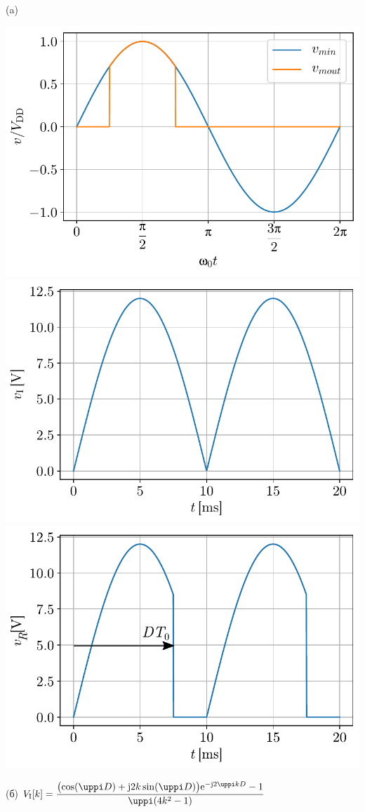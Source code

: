 \textsc{} (a) \\
\begin{center}
    \includegraphics[scale=0.4]{fig/T2_a.pdf}
    \includegraphics[scale=0.4]{fig/T2_b.pdf} \\
    \includegraphics[scale=0.4]{fig/T2_c.pdf} \\
\end{center}
(б) $V_{\rm I}[k] = 
\dfrac{
\bigl(
\cos(\uppi D) + 
{\rm j}2k \sin(\uppi D) 
\bigr)
{\rm e}^{-{\rm j}2\uppi kD }
-1 }{\uppi(4k^2 - 1)}$